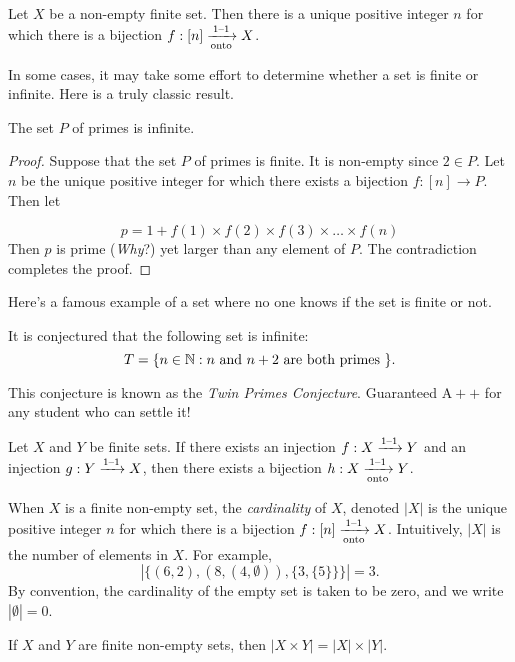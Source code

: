 \begin{proposition}
Let $X$ be a non-empty finite set.  Then there is a unique
positive integer $n$ for which there is a bijection $f:[n]\xrightarrow[\text{onto}]{\text{$1$--$1$}} X$.
\end{proposition}

In some cases, it may take some effort to determine whether a set
is finite or infinite.  Here is a truly
classic result.

\begin{proposition}
The set $P$ of primes is infinite.
\end{proposition}
\begin{proof}
Suppose that the set $P$ of primes is finite.  It is non-empty
since $2\in P$.  Let $n$ be the unique positive integer for
which there exists a bijection $f:[n]\rightarrow P$.  Then let 

\[
p=1+f(1)\times f(2)\times f(3)\times \dots\times f(n)
\]
Then $p$ is prime (\textit{Why}?) yet larger than any element of $P$.
The contradiction completes the proof.
\end{proof}

Here's a famous example of a set where no one knows if
the set is finite or not.

\begin{conjecture}  It is conjectured that the following
set is infinite:
\[
T=\{n\in\mathbb{N}:n \text{ and } n+2 \text{ are both
primes }\}. 
\]
\end{conjecture}
This conjecture is known as the \textit{Twin Primes Conjecture}.
Guaranteed $\text{A}++$ for any student who can settle it!
 
\begin{proposition}\label{exe:sb}
Let $X$ and $Y$ be finite sets.  If there exists an injection
$f:X\xrightarrow[]{\text{$1$--$1$}} Y$ and an injection $g:Y \xrightarrow[]{\text{$1$--$1$}} X$, then
there exists a bijection $h:X \xrightarrow[\text{onto}]{\text{$1$--$1$}} Y$.
\end{proposition}

When $X$ is a finite non-empty set, the \textit{cardinality} of $X$,
denoted $|X|$ is the unique positive integer $n$ for which
there is a bijection $f:[n]\xrightarrow[\text{onto}]{\text{$1$--$1$}} X$.  Intuitively,
$|X|$ is the number of elements in $X$.  For example,
\[
|\{(6,2), (8,(4,\emptyset)), \{3,\{5\}\}\}|=3.
\]
By convention, 
the cardinality of the empty set is taken to be zero, and we write
$|\emptyset|=0$.

\begin{proposition}\label{prop:xy} 
If $X$ and $Y$ are finite non-empty sets, then
$|X\times Y| =|X|\times |Y|$.
\end{proposition}

